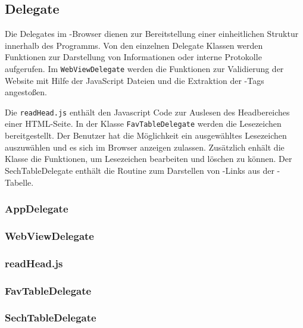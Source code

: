 \subsection{Delegate}

Die Delegates im \SECH-Browser dienen zur Bereitstellung einer einheitlichen Struktur innerhalb des Programms. Von den einzelnen Delegate Klassen werden Funktionen zur Darstellung von Informationen oder interne Protokolle aufgerufen. Im \lstinline|WebViewDelegate| werden die Funktionen zur Validierung der Website mit Hilfe der JavaScript Dateien und die Extraktion der \SEARCH-Tags angestoßen.

Die \lstinline|readHead.js| enthält den Javascript Code zur Auslesen des Headbereiches einer HTML-Seite. In der Klasse \lstinline|FavTableDelegate| werden die Lesezeichen bereitgestellt. Der Benutzer hat die Möglichkeit ein ausgewähltes Lesezeichen auszuwählen und es sich im Browser anzeigen zulassen. Zusätzlich enhält die Klasse die Funktionen, um Lesezeichen bearbeiten und löschen zu können. Der SechTableDelegate enthält die Routine zum Darstellen von \SEARCH-Links aus der \SECH-Tabelle. 
\subsubsection{AppDelegate}
\subsubsection{WebViewDelegate}
\subsubsection{readHead.js}
\subsubsection{FavTableDelegate}
\subsubsection{SechTableDelegate}

